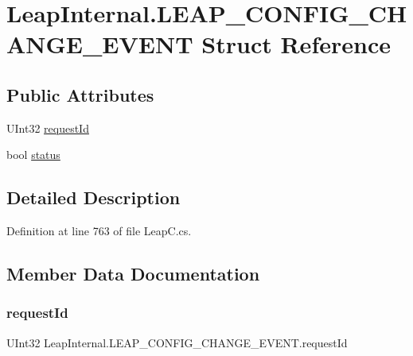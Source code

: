 \hypertarget{struct_leap_internal_1_1_l_e_a_p___c_o_n_f_i_g___c_h_a_n_g_e___e_v_e_n_t}{}\section{Leap\+Internal.\+L\+E\+A\+P\+\_\+\+C\+O\+N\+F\+I\+G\+\_\+\+C\+H\+A\+N\+G\+E\+\_\+\+E\+V\+E\+NT Struct Reference}
\label{struct_leap_internal_1_1_l_e_a_p___c_o_n_f_i_g___c_h_a_n_g_e___e_v_e_n_t}
\subsection*{Public Attributes}
\begin{DoxyCompactItemize}
\item 
U\+Int32 \mbox{\hyperlink{struct_leap_internal_1_1_l_e_a_p___c_o_n_f_i_g___c_h_a_n_g_e___e_v_e_n_t_aa40d14841ec918c7594c27b7d2943790}{request\+Id}}
\item 
bool \mbox{\hyperlink{struct_leap_internal_1_1_l_e_a_p___c_o_n_f_i_g___c_h_a_n_g_e___e_v_e_n_t_a5ad350acad44f5a2ec4ba055e8e9dd07}{status}}
\end{DoxyCompactItemize}


\subsection{Detailed Description}


Definition at line 763 of file Leap\+C.\+cs.



\subsection{Member Data Documentation}
\mbox{\label{struct_leap_internal_1_1_l_e_a_p___c_o_n_f_i_g___c_h_a_n_g_e___e_v_e_n_t_aa40d14841ec918c7594c27b7d2943790}} 
\subsubsection{\texorpdfstring{requestId}{requestId}}
{\footnotesize\ttfamily U\+Int32 Leap\+Internal.\+L\+E\+A\+P\+\_\+\+C\+O\+N\+F\+I\+G\+\_\+\+C\+H\+A\+N\+G\+E\+\_\+\+E\+V\+E\+N\+T.\+request\+Id}




